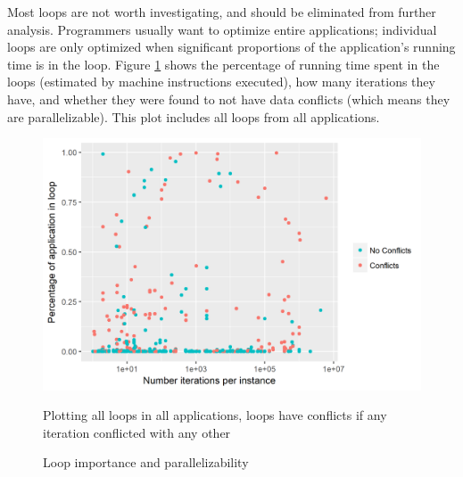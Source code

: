 \documentclass[12pt,twoside]{reedthesis}
\begin{document}
		Most loops are not worth investigating, and should be eliminated from further analysis. 
		Programmers usually want to optimize entire applications; individual loops are only optimized when significant proportions of the application's running time is in the loop. 
		Figure \ref{fig:size-iteration-plots} shows the percentage of running time spent in the loops (estimated by machine instructions executed), how many iterations they have, and whether they were found to not have data conflicts (which means they are parallelizable). This plot includes all loops from all applications. 
		
		
		\begin{figure}
			\caption{Loop importance and parallelizability}
			\label{fig:size-iteration-plots}
			
			\begin{minipage}{0.73\textwidth} %
				\includegraphics[scale=0.7]{plots/size_iteration_plot.png}
				{\footnotesize Plotting all loops in all applications, loops have conflicts if any iteration conflicted with any other\par}
			\end{minipage}
		\end{figure}
		
\end{document}

